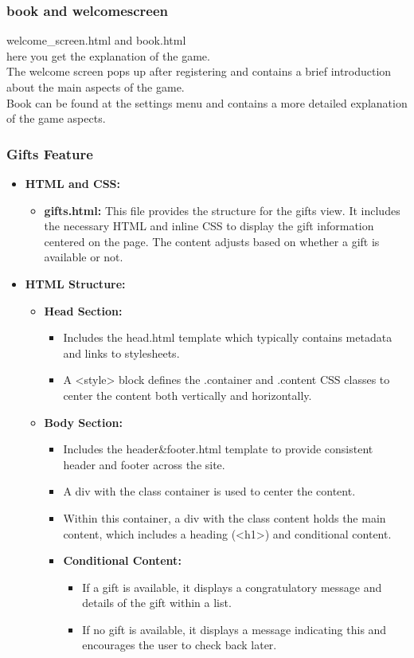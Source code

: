 \documentclass[12pt]{article}
\begin{document}
\subsubsection{book and welcomescreen}
\begin{itemize}
    welcome_screen.html and book.html\\
    here you get the explanation of the game.\\
    The welcome screen pops up after registering and contains a brief introduction about the main aspects of the game.\\
    Book can be found at the settings menu and contains a more detailed explanation of the game aspects.
\end{itemize}

\subsubsection{Gifts Feature}
\begin{itemize}
\item \textbf{HTML and CSS:}
\begin{itemize}
\item \textbf{gifts.html:} This file provides the structure for the gifts view. It includes the necessary HTML and inline CSS to display the gift information centered on the page. The content adjusts based on whether a gift is available or not.
\end{itemize}
\item \textbf{HTML Structure:}
\begin{itemize}
\item \textbf{Head Section:}
\begin{itemize}
\item Includes the head.html template which typically contains metadata and links to stylesheets.
\item A <style> block defines the .container and .content CSS classes to center the content both vertically and horizontally.
\end{itemize}
\item \textbf{Body Section:}
\begin{itemize}
\item Includes the header&footer.html template to provide consistent header and footer across the site.
\item A div with the class container is used to center the content.
\item Within this container, a div with the class content holds the main content, which includes a heading (<h1>) and conditional content.
\item \textbf{Conditional Content:}
\begin{itemize}
\item If a gift is available, it displays a congratulatory message and details of the gift within a list.
\item If no gift is available, it displays a message indicating this and encourages the user to check back later.
\end{itemize}
\end{itemize}
\end{itemize}
\end{itemize}
\end{document}
